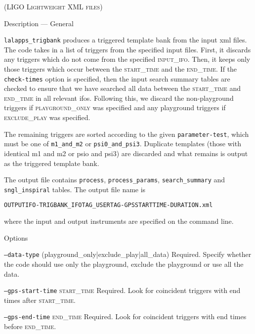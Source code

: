 \begin{entry}
\textsc{(LIGO Lightweight XML files)}

\item[Description --- General] 

\verb$lalapps_trigbank$ produces a triggered template bank from the input xml
files.  The code takes in a list of triggers from the specified input files.
First, it discards any triggers which do not come from the specified
\textsc{input\_ifo}.  Then, it keeps only those triggers which occur between
the \textsc{start\_time} and the \textsc{end\_time}. If the
\texttt{check-times} option is specified, then the input search summary tables
are checked to ensure that we have searched all data between the
\textsc{start\_time} and \textsc{end\_time} in all relevant ifos.  Following
this, we discard the non-playground triggers if \textsc{playground\_only} was
specified and any playground triggers if \textsc{exclude\_play} was specified.

The remaining triggers are sorted according to the given
\texttt{parameter-test}, which must be one of \texttt{m1\_and\_m2} or
\texttt{psi0\_and\_psi3}.  Duplicate templates (those with identical m1
and m2 or psio and psi3) are discarded and what
remains is output as the triggered template bank.  


The output file contains \texttt{process}, \texttt{process\_params},
\texttt{search\_summary} and \texttt{sngl\_inspiral} tables.  The output
file name is 
\begin{center}
\texttt{OUTPUTIFO-TRIGBANK\_IFOTAG\_USERTAG-GPSSTARTTIME-DURATION.xml}\\
\end{center}
where the input and output instruments are specified on the command line.

\item[Options]\leavevmode
\begin{entry}

\item[\texttt{--data-type} (playground\_only|exclude\_play|all\_data)]
Required.  Specify whether the code should use only the playground, exclude
the playground or use all the data. 

\item[\texttt{--gps-start-time} \textsc{start\_time}] Required.  Look
for coincident triggers with end times after \textsc{start\_time}.

\item[\texttt{--gps-end-time} \textsc{end\_time}] Required.  Look for
coincident triggers with end times before \textsc{end\_time}.


\end{entry}
\end{entry}
